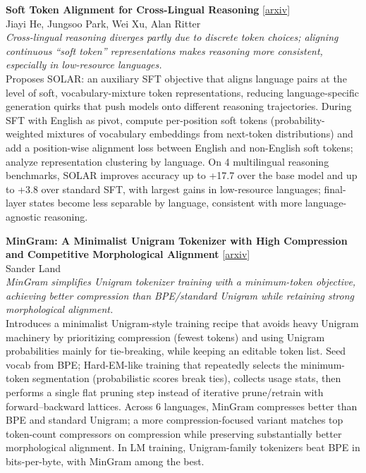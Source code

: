 \documentclass[12pt,letterpaper]{article}
\begin{document}
\medskip

{\small\textbf{Soft Token Alignment for Cross-Lingual Reasoning}} {\scriptsize[\href{https://arxiv.org/abs/2606.26466}{arxiv}]}\\
{\scriptsize Jiayi He, Jungsoo Park, Wei Xu, Alan Ritter}\\

{\small\textit{Cross-lingual reasoning diverges partly due to discrete token choices; aligning continuous ``soft token'' representations makes reasoning more consistent, especially in low-resource languages.}}\\[1pt]
{\footnotesize Proposes SOLAR: an auxiliary SFT objective that aligns language pairs at the level of soft, vocabulary-mixture token representations, reducing language-specific generation quirks that push models onto different reasoning trajectories. During SFT with English as pivot, compute per-position soft tokens (probability-weighted mixtures of vocabulary embeddings from next-token distributions) and add a position-wise alignment loss between English and non-English soft tokens; analyze representation clustering by language. On 4 multilingual reasoning benchmarks, SOLAR improves accuracy up to +17.7 over the base model and up to +3.8 over standard SFT, with largest gains in low-resource languages; final-layer states become less separable by language, consistent with more language-agnostic reasoning.}

\medskip

{\small\textbf{MinGram: A Minimalist Unigram Tokenizer with High Compression and Competitive Morphological Alignment}} {\scriptsize[\href{https://arxiv.org/abs/2606.27019}{arxiv}]}\\
{\scriptsize Sander Land}\\

{\small\textit{MinGram simplifies Unigram tokenizer training with a minimum-token objective, achieving better compression than BPE/standard Unigram while retaining strong morphological alignment.}}\\[1pt]
{\footnotesize Introduces a minimalist Unigram-style training recipe that avoids heavy Unigram machinery by prioritizing compression (fewest tokens) and using Unigram probabilities mainly for tie-breaking, while keeping an editable token list. Seed vocab from BPE; Hard-EM-like training that repeatedly selects the minimum-token segmentation (probabilistic scores break ties), collects usage stats, then performs a single flat pruning step instead of iterative prune/retrain with forward--backward lattices. Across 6 languages, MinGram compresses better than BPE and standard Unigram; a more compression-focused variant matches top token-count compressors on compression while preserving substantially better morphological alignment. In LM training, Unigram-family tokenizers beat BPE in bits-per-byte, with MinGram among the best.}
\end{document}
